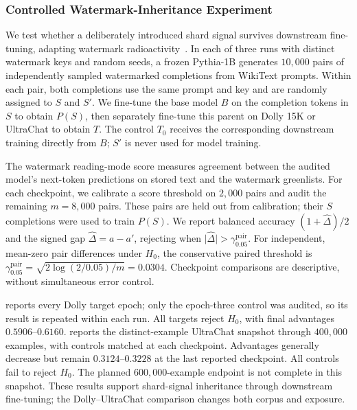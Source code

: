 \subsubsection{Controlled Watermark-Inheritance Experiment}
\label{subsubsec:watermark-inheritance}

We test whether a deliberately introduced shard signal survives downstream
fine-tuning, adapting watermark radioactivity~\citep{sander2024watermarking}.
In each of three runs with distinct watermark keys and random seeds, a frozen
Pythia-1B generates $10{,}000$ pairs of independently sampled watermarked
completions from WikiText prompts. Within each pair, both completions use the
same prompt and key and are randomly assigned to $S$ and $S'$.
We fine-tune the base model $B$ on the completion tokens in $S$ to obtain
$P(S)$, then separately fine-tune this parent on Dolly 15K or UltraChat to
obtain $T$. The control $T_0$ receives the corresponding downstream training
directly from $B$; $S'$ is never used for model training.

The watermark reading-mode score measures agreement between the audited
model's next-token predictions on stored text and the watermark greenlists.
For each checkpoint, we calibrate a score threshold on $2{,}000$ pairs and
audit the remaining $m=8{,}000$ pairs. These pairs are held out from calibration;
their $S$ completions were used to train $P(S)$.
We report balanced accuracy $(1+\widehat{\Delta})/2$ and the signed gap
$\widehat{\Delta}=a-a'$, rejecting when
$\lvert\widehat{\Delta}\rvert>\gamma^{\mathrm{pair}}_{0.05}$.
For independent, mean-zero pair differences under $H_0$, the conservative
paired threshold is
$\gamma^{\mathrm{pair}}_{0.05}=\sqrt{2\log(2/0.05)/m}=0.0304$.
Checkpoint comparisons are descriptive, without simultaneous error control.

 reports every Dolly target epoch; only the
epoch-three control was audited, so its result is repeated within each run.
All targets reject $H_0$, with final advantages $0.5906$--$0.6160$.
 reports the distinct-example UltraChat
snapshot through $400{,}000$ examples, with controls matched at each checkpoint.
Advantages generally decrease but remain $0.3124$--$0.3228$ at the last reported
checkpoint. All controls fail to reject $H_0$.
The planned $600{,}000$-example endpoint is not complete in this snapshot.
These results support shard-signal inheritance through downstream fine-tuning;
the Dolly--UltraChat comparison changes both corpus and exposure.

